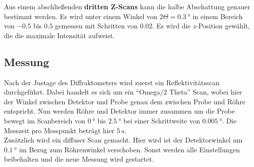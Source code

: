         \noindent Aus einem abschließenden \textbf{dritten Z-Scans} kann die halbe Abschattung genauer bestimmt werden. Es wird unter einem Winkel von 
        $2 \Theta = \SI{0.3}{\degree}$ in einem Bereich von $\num{-0.5}$ bis $\num{0.5}$ gemessen mit Schritten von $\num{0.02}$. Es wird die $z$-Position 
        gewählt, die die maximale Intensität aufweist. 

    \subsection{Messung}

        \noindent Nach der Justage des Diffraktometers wird zuerst ein Reflektivitätsscan durchgeführt. Dabei handelt es sich um ein 
        \enquote{Omega/2 Theta} Scan, wobei hier der Winkel zwischen Detektor und Probe genau dem zwischen Probe und Röhre entspricht. 
        Nun werden Röhre und Detektor immer zusammen um die Probe bewegt im Scanbereich von $\SI{0}{\degree}$ bis $\SI{2.5}{\degree}$ bei einer
        Schrittweite von $\SI{0.005}{\degree}$. Die Messzeit pro Messpunkt beträgt hier $\SI{5}{\second}$. \\
        Zusätzlich wird ein diffuser Scan gemacht. Hier wird ist der Detektorwinkel um $\SI{0.1}{\degree}$ im Bezug zum Röhrenwinkel verschoben. 
        Sonst werden alle Einstellungen beibehalten und die neue Messung wird gestartet. 
  
